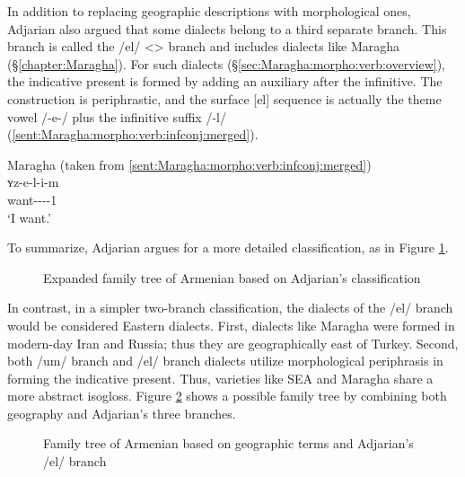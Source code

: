 In addition to replacing geographic descriptions with morphological ones, Adjarian also argued that some dialects belong to a third separate branch. This branch is called the /el/ <> branch and includes dialects like Maragha (\S\ref{chapter:Maragha}). For such dialects (\S\ref{sec:Maragha:morpho:verb:overview}), the indicative present is formed by adding an auxiliary after the infinitive. The construction is periphrastic, and the surface [el] sequence is actually the theme vowel /-e-/ plus the infinitive suffix /-l/ (\ref{sent:Maragha:morpho:verb:infconj:merged}). 

\begin{exe}
		\ex Maragha (taken from \ref{sent:Maragha:morpho:verb:infconj:merged})
\\
	 \gll ʏz-e-l-i-m \\
			want-{\thgloss}-{\infgloss}-{\aux}-1{\sg} \\
			\trans `I want.'\\
			 \label{sent:Maragha:morpho:verb:infconj:merged REP in intro} 
			
	
\end{exe}

To summarize, Adjarian argues for a more detailed classification, as in Figure \ref{tree:dialect:adj}. 

\begin{figure}[H]
	\caption{Expanded family tree of Armenian based on Adjarian's classification}
	\label{tree:dialect:adj}
\end{figure}

In contrast, in a simpler two-branch classification, the dialects of the /el/ branch would be considered Eastern dialects. First, dialects like Maragha were formed in modern-day Iran and Russia; thus they are geographically east of Turkey. Second, both /um/ branch and /el/ branch dialects utilize morphological periphrasis in forming the indicative present. Thus, varieties like SEA and Maragha share a more abstract isogloss. Figure \ref{tree:dialect:compromise} shows a possible family tree by combining both geography and Adjarian's three branches. 

\begin{figure}[H]
	\caption{Family tree of Armenian based on geographic terms and Adjarian's /el/ branch}
	\label{tree:dialect:compromise}
\end{figure}
 
